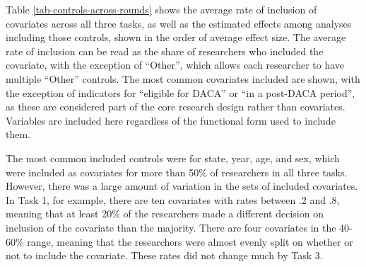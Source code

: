 \documentclass[
  letterpaper,
  DIV=11,
  numbers=noendperiod]{scrartcl}
\begin{document}
\begin{table}[!htbp] \centering \renewcommand*{\arraystretch}{1.1}\caption{Estimation Methods}
\end{table}

Table \ref{tab-controls-across-rounds} shows the average rate of
inclusion of covariates across all three tasks, as well as the estimated
effects among analyses including those controls, shown in the order of
average effect size. The average rate of inclusion can be read as the
share of researchers who included the covariate, with the exception of
``Other'', which allows each researcher to have multiple ``Other''
controls. The most common covariates included are shown, with the
exception of indicators for ``eligible for DACA'' or ``in a post-DACA
period'', as these are considered part of the core research design
rather than covariates. Variables are included here regardless of the
functional form used to include them.

The most common included controls were for state, year, age, and sex,
which were included as covariates for more than 50\% of researchers in
all three tasks. However, there was a large amount of variation in the
sets of included covariates. In Task 1, for example, there are ten
covariates with rates between .2 and .8, meaning that at least 20\% of
the researchers made a different decision on inclusion of the covariate
than the majority. There are four covariates in the 40-60\% range,
meaning that the researchers were almost evenly split on whether or not
to include the covariate. These rates did not change much by Task 3.
\end{document}

